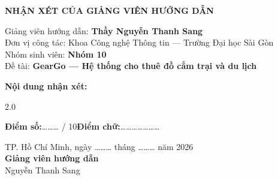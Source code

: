 \thispagestyle{empty}

\begin{center}
{\Large\textbf{NHẬN XÉT CỦA GIẢNG VIÊN HƯỚNG DẪN}}\\[1cm]
\end{center}

\vspace{0.5cm}

\noindent
Giảng viên hướng dẫn: \textbf{Thầy Nguyễn Thanh Sang}\\[0.3cm]
Đơn vị công tác: Khoa Công nghệ Thông tin --- Trường Đại học Sài Gòn\\[0.3cm]
Nhóm sinh viên: \textbf{Nhóm 10}\\[0.3cm]
Đề tài: \textbf{GearGo --- Hệ thống cho thuê đồ cắm trại và du lịch}

\vspace{1.5cm}

\noindent
\textbf{Nội dung nhận xét:}\\[0.5cm]

\begin{spacing}{2.0}
\noindent\makebox[\linewidth]{\dotfill}

\noindent\makebox[\linewidth]{\dotfill}

\noindent\makebox[\linewidth]{\dotfill}

\noindent\makebox[\linewidth]{\dotfill}

\noindent\makebox[\linewidth]{\dotfill}

\noindent\makebox[\linewidth]{\dotfill}

\noindent\makebox[\linewidth]{\dotfill}

\noindent\makebox[\linewidth]{\dotfill}

\noindent\makebox[\linewidth]{\dotfill}

\noindent\makebox[\linewidth]{\dotfill}
\end{spacing}

\vspace{1.5cm}

\noindent
\textbf{Điểm số:}\hspace{1cm}……… / 10\hspace{1cm}\textbf{Điểm chữ:}\hspace{0.5cm}…………………

\vspace{2cm}

\begin{flushright}
TP. Hồ Chí Minh, ngày ……… tháng ……… năm 2026\\[0.3cm]
\textbf{Giảng viên hướng dẫn}\\[2cm]
Nguyễn Thanh Sang
\end{flushright}
